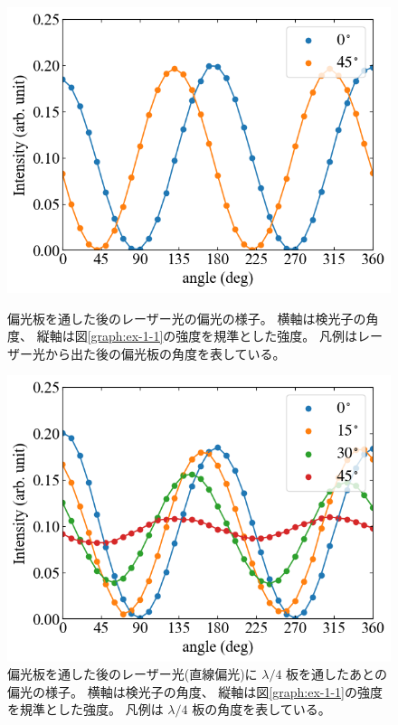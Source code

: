 \documentclass[9pt,dvipdfmx,a4paper]{jsarticle}
\begin{document}
\begin{figure}[H]
    \centering
    \begin{minipage}[t]{0.48\columnwidth}
        \centering
        \includegraphics[width=\columnwidth]{11_29_02.png}
        \caption{偏光板を通した後のレーザー光の偏光の様子。
        横軸は検光子の角度、
        縦軸は図\ref{graph:ex-1-1}の強度を規準とした強度。
        凡例はレーザー光から出た後の偏光板の角度を表している。}
        \label{graph:ex-2-1}
    \end{minipage}
    \hfill
    \begin{minipage}[t]{0.48\columnwidth}
        \centering
        \includegraphics[width=\columnwidth]{11_29_03.png}
        \caption{偏光板を通した後のレーザー光(直線偏光)に \(\lambda/4\) 板を通したあとの偏光の様子。
        横軸は検光子の角度、
        縦軸は図\ref{graph:ex-1-1}の強度を規準とした強度。
        凡例は \(\lambda/4\) 板の角度を表している。}
        \label{graph:ex-2-2}
    \end{minipage}
\end{figure}
\end{document}
